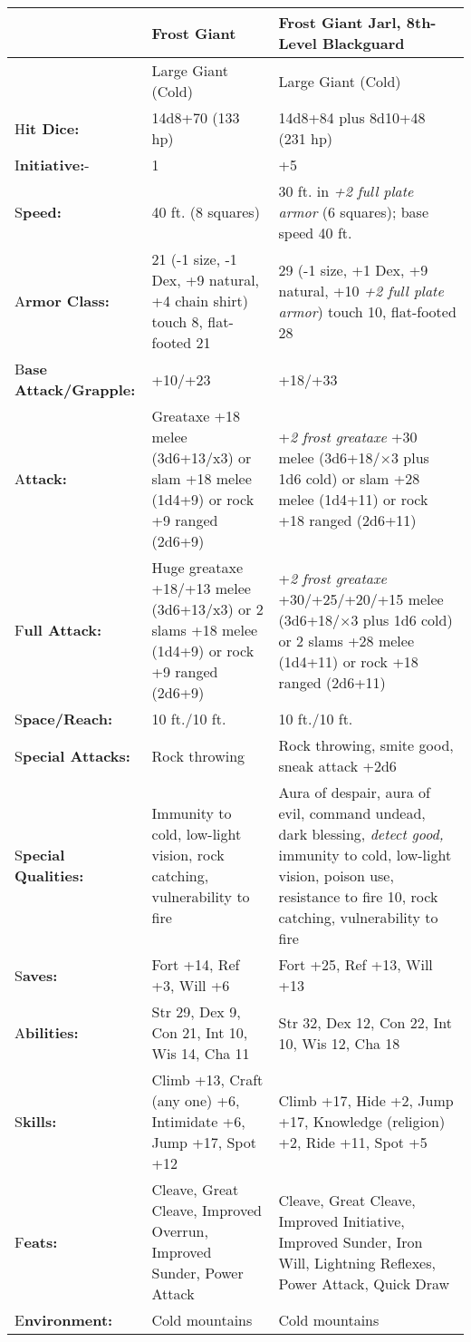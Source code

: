 \documentclass{article}
\begin{document}
\begin{tabular}{|>{\raggedright}p{47pt}|>{\raggedright}p{133pt}|>{\raggedright}p{133pt}|}
\hline
  & F\textbf{rost Giant} & F\textbf{rost Giant Jarl, 8th-Level Blackguard}\tabularnewline
\hline
  & Large Giant (Cold) & Large Giant (Cold)\tabularnewline
\hline
H\textbf{it Dice:} & 14d8+70 (133 hp) & 14d8+84 plus 8d10+48 (231 hp)\tabularnewline
\hline
I\textbf{nitiative:}- & 1 & +5\tabularnewline
\hline
S\textbf{peed:} & 40 ft. (8 squares) & 30 ft. in \textit{+2 full plate armor }(6 
squares); base speed 40 ft.\tabularnewline
\hline
A\textbf{rmor Class:} & 21 (-1 size, -1 Dex, +9 natural, +4 chain shirt) touch 
8, flat-footed 21 & 29 (-1 size, +1 Dex, +9 natural, +10 \textit{+2 full plate 
armor}) touch 10, flat-footed 28\tabularnewline
\hline
B\textbf{ase Attack/Grapple:} & +10/+23 & +18/+33\tabularnewline
\hline
A\textbf{ttack:} & Greataxe +18 melee (3d6+13/x3) or slam +18 melee (1d4+9) or 
rock +9 ranged (2d6+9) & +\textit{2 frost greataxe }+30 melee (3d6+18/\ensuremath{\times}3 
plus 1d6 cold) or slam +28 melee (1d4+11) or rock +18 ranged (2d6+11)\tabularnewline
\hline
F\textbf{ull Attack:} & Huge greataxe +18/+13 melee (3d6+13/x3) or 2 slams +18 
melee (1d4+9) or rock +9 ranged (2d6+9) & +\textit{2 frost greataxe }+30/+25/+20/+15 
melee (3d6+18/\ensuremath{\times}3 plus 1d6 cold) or 2 slams +28 melee (1d4+11) 
or rock +18 ranged (2d6+11)\tabularnewline
\hline
S\textbf{pace/Reach: } & 10 ft./10 ft. & 10 ft./10 ft.\tabularnewline
\hline
S\textbf{pecial Attacks:} & Rock throwing & Rock throwing, smite good, sneak attack 
+2d6 \tabularnewline
\hline
S\textbf{pecial Qualities:} & Immunity to cold, low-light vision, rock catching, 
vulnerability to fire & Aura of despair, aura of evil, command undead, dark blessing, 
\textit{detect good, }immunity to cold, low-light vision, poison use, resistance 
to fire 10, rock catching, vulnerability to fire \tabularnewline
\hline
S\textbf{aves:} & Fort +14, Ref +3, Will +6 & Fort +25, Ref +13, Will +13\tabularnewline
\hline
A\textbf{bilities:} & Str 29, Dex 9, Con 21, Int 10, Wis 14, Cha 11 & Str 32, Dex 
12, Con 22, Int 10, Wis 12, Cha 18\tabularnewline
\hline
S\textbf{kills:} & Climb +13, Craft (any one) +6, Intimidate +6, Jump +17, Spot 
+12 & Climb +17, Hide +2, Jump +17, Knowledge (religion) +2, Ride +11, Spot +5\tabularnewline
\hline
F\textbf{eats:} & Cleave, Great Cleave, Improved Overrun, Improved Sunder, Power 
Attack & Cleave, Great Cleave, Improved Initiative, Improved Sunder, Iron Will, 
Lightning Reflexes, Power Attack, Quick Draw\tabularnewline
\hline
E\textbf{nvironment:} & Cold mountains & Cold mountains\tabularnewline

\end{tabular}
\end{document}
